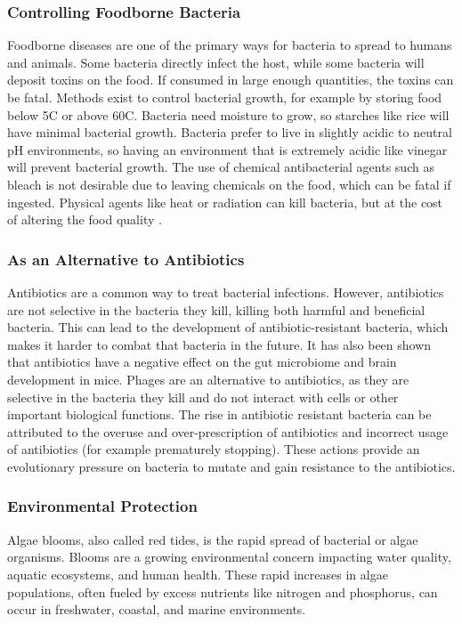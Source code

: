 \subsubsection{Controlling Foodborne Bacteria}
Foodborne diseases are one of the primary ways for bacteria to spread to humans and animals. Some bacteria directly infect the host, while some bacteria will deposit toxins on the food. If consumed in large enough quantities, the toxins can be fatal. Methods exist to control bacterial growth, for example by storing food below 5C or above 60C. Bacteria need moisture to grow, so starches like rice will have minimal bacterial growth. Bacteria prefer to live in slightly acidic to neutral pH environments, so having an environment that is extremely acidic like vinegar will prevent bacterial growth. The use of chemical antibacterial agents such as bleach is not desirable due to leaving chemicals on the food, which can be fatal if ingested. Physical agents like heat or radiation can kill bacteria, but at the cost of altering the food quality \cite{fieseler_food_2021}. 

\subsubsection{As an Alternative to Antibiotics}
Antibiotics are a common way to treat bacterial infections. However, antibiotics are not selective in the bacteria they kill, killing both harmful and beneficial bacteria. This can lead to the development of antibiotic-resistant bacteria, which makes it harder to combat that bacteria in the future. It has also been shown that antibiotics have a negative effect on the gut microbiome and brain development in mice. Phages are an alternative to antibiotics, as they are selective in the bacteria they kill and do not interact with cells or other important biological functions. The rise in antibiotic resistant bacteria can be attributed to the overuse and over-prescription of antibiotics and incorrect usage of antibiotics (for example prematurely stopping). These actions provide an evolutionary pressure on bacteria to mutate and gain resistance to the antibiotics. 

\subsubsection{Environmental Protection}
Algae blooms, also called red tides, is the rapid spread of bacterial or algae organisms. Blooms are a growing environmental concern impacting water quality, aquatic ecosystems, and human health. These rapid increases in algae populations, often fueled by excess nutrients like nitrogen and phosphorus, can occur in freshwater, coastal, and marine environments. 

